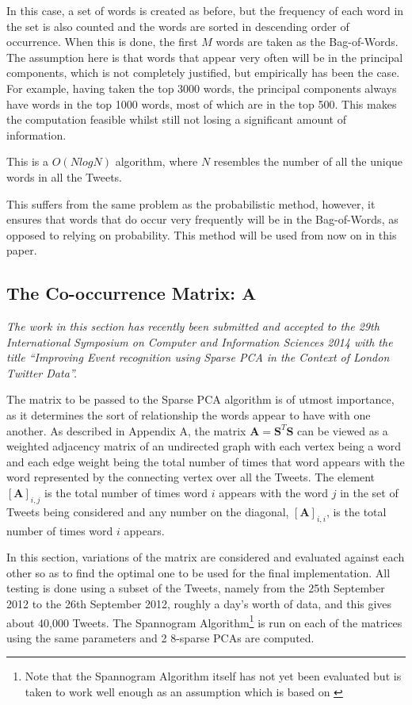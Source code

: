 \documentclass[11pt,a4paper]{article}
\newcommand{\covmat}{\mathbf{A}}
\begin{document}
In this case, a set of words is created as before, but the frequency of each word in the set is also counted and the words are sorted in descending order of occurrence. When this is done, the first $M$ words are taken as the Bag-of-Words. The assumption here is that words that appear very often will be in the principal components, which is not completely justified, but empirically has been the case. For example, having taken the top 3000 words, the principal components always have words in the top 1000 words, most of which are in the top 500. This makes the computation feasible whilst still not losing a significant amount of information.

This is a $O(NlogN)$ algorithm, where $N$ resembles the number of all the unique words in all the Tweets. 

This suffers from the same problem as the probabilistic method, however, it ensures that words that do occur very frequently will be in the Bag-of-Words, as opposed to relying on probability. This method will be used from now on in this paper.

\subsection{The Co-occurrence Matrix: $\mathbf{A}$}
\label{covmat}
\textit{The work in this section has recently been submitted and accepted to the 29th International Symposium on Computer and Information Sciences 2014 with the title ``Improving Event recognition using Sparse PCA in the Context of London Twitter Data''.}


The matrix to be passed to the Sparse PCA algorithm is of utmost importance, as it determines the sort of relationship the words appear to have with one another. As described in Appendix A, the matrix $\mathbf{A} = \mathbf{S}^T \mathbf{S}$ can be viewed as a weighted adjacency matrix of an undirected graph with each vertex being a word and each edge weight being the total number of times that word appears with the word represented by the connecting vertex over all the Tweets. The element $[\covmat]_{i, j}$ is the total number of times word $i$ appears with the word $j$ in the set of Tweets being considered and any number on the diagonal, $[\covmat]_{i, i}$, is the total number of times word $i$ appears. 

In this section, variations of the matrix are considered and evaluated against each other so as to find the optimal one to be used for the final implementation. All testing is done using a subset of the Tweets, namely from the 25th September 2012 to the 26th September 2012, roughly a day's worth of data, and this gives about 40,000 Tweets. The Spannogram Algorithm\footnote{Note that the Spannogram Algorithm itself has not yet been evaluated but is taken to work well enough as an assumption which is based on \cite{dimakis}} is run on each of the matrices using the same parameters and 2 8-sparse PCAs are computed.
\end{document}
